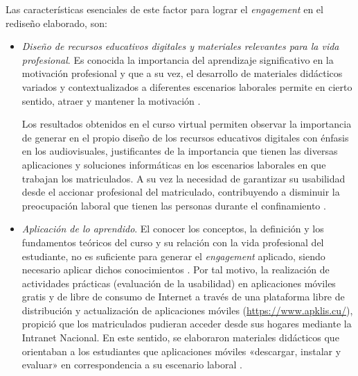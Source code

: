 \documentclass{textolivre}
\begin{document}
Las características esenciales de este factor para lograr el \emph{engagement} en el rediseño elaborado, son:

\begin{itemize}
    \item \emph{Diseño de recursos educativos digitales y materiales relevantes para la vida profesional}. Es conocida la importancia del aprendizaje significativo en la motivación profesional \cite{brown2017} %
    y que a su vez, el desarrollo de materiales didácticos variados y contextualizados a diferentes escenarios laborales permite en cierto sentido, atraer y mantener la motivación \cite{elmaadaway2017}.%
    
    Los resultados obtenidos en el curso virtual permiten observar la importancia de generar en el propio diseño de los recursos educativos digitales con énfasis en los audiovisuales, justificantes de la importancia que tienen las diversas aplicaciones y soluciones informáticas en los escenarios laborales en que trabajan los matriculados. A su vez la necesidad de garantizar su usabilidad desde el accionar profesional del matriculado, contribuyendo a disminuir la preocupación laboral que tienen las personas durante el confinamiento \cite{amaya2021, hernandezramos2021}. %
    
    \item \emph{Aplicación de lo aprendido}. El conocer los conceptos, la definición y los fundamentos teóricos del curso y su relación con la vida profesional del estudiante, no es suficiente para generar el \emph{engagement} aplicado, siendo necesario aplicar dichos conocimientos \cite{mohd2020}. %
    Por tal motivo, la realización de actividades prácticas (evaluación de la usabilidad) en aplicaciones móviles gratis y de libre de consumo de Internet a través de una plataforma libre de distribución y actualización de aplicaciones móviles (\url{https://www.apklis.cu/}), propició que los matriculados pudieran acceder desde sus hogares mediante la Intranet Nacional. En este sentido, se elaboraron materiales didácticos que orientaban a los estudiantes que aplicaciones móviles «descargar, instalar y evaluar» en correspondencia a su escenario laboral \cite{brown2017, elmaadaway2017, davis2018, buchele2020}. %

\end{itemize}
\end{document}
